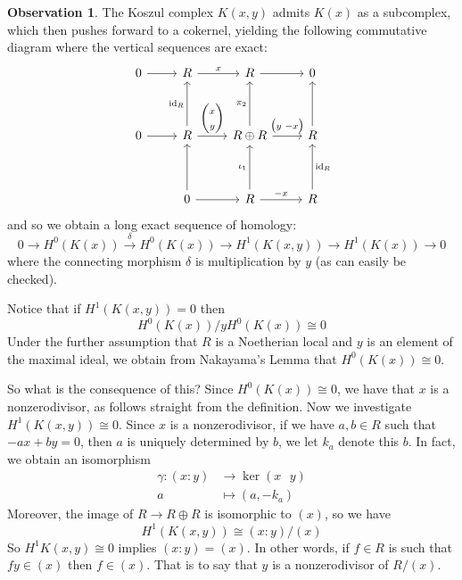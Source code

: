 \documentclass[12pt]{article}
\theoremstyle{plain}
\theoremstyle{definition}
\newtheorem{observation}[thm]{Observation}
\newcommand{\lto}{\longrightarrow}
\begin{document}
\begin{observation}\label{obs:koszul_reg}
	The Koszul complex $K(x,y)$ admits $K(x)$ as a subcomplex, which then pushes forward to a cokernel, yielding the following commutative diagram where the vertical sequences are exact:
	\begin{equation}\label{eq:sub_quotient}
		\begin{tikzcd}[row sep = huge]
			0\arrow[r] & R\arrow[r,"{x}"] & R\arrow[r] & 0\\
			0\arrow[r] & R\arrow[u,"{\operatorname{id}_R}"]\arrow[r,"{\begin{pmatrix}
					x\\
					y
				\end{pmatrix}
			}"] & R \oplus R\arrow[r,"{\begin{pmatrix}
					y \text{  } -x
				\end{pmatrix}
			}"]\arrow[u,"{\pi_2}"] & R\arrow[u]\\
			& 0\arrow[u]\arrow[r] & R\arrow[r,"{-x}"]\arrow[u,"{\iota_1}"] & R\arrow[u,swap,"{\operatorname{id}_R}"]
		\end{tikzcd}
	\end{equation}
	and so we obtain a long exact sequence of homology:
	\begin{equation}
		0\lto H^0(K(x)) \stackrel{\delta}{\lto} H^0(K(x)) \lto H^1(K(x,y)) \lto H^1(K(x))\lto 0
	\end{equation}
	where the connecting morphism $\delta$ is multiplication by $y$ (as can easily be checked).
	
	Notice that if $H^1(K(x,y))=0$ then
	\begin{equation}
		H^0(K(x))/yH^0(K(x)) \cong 0
	\end{equation}
	Under the further assumption that $R$ is a Noetherian local and $y$ is an element of the maximal ideal, we obtain from Nakayama's Lemma that $H^0(K(x)) \cong 0$.
	
	So what is the consequence of this? Since $H^0(K(x)) \cong 0$, we have that $x$ is a nonzerodivisor, as follows straight from the definition. Now we investigate $H^1(K(x,y)) \cong 0$. Since $x$ is a nonzerodivisor, if we have $a,b \in R$ such that $-ax + by = 0$, then $a$ is uniquely determined by $b$, we let $k_a$ denote this $b$. In fact, we obtain an isomorphism
	\begin{align*}
		\gamma: (x:y) &\lto \operatorname{ker}(x\text{ }y)\\
		a &\longmapsto (a,-k_a)
	\end{align*}
	Moreover, the image of $R \lto R \oplus R$ is isomorphic to $(x)$, so we have
	\begin{equation}
		H^1(K(x,y)) \cong (x:y)/(x)
	\end{equation}
	So $H^1K(x,y) \cong 0$ implies $(x:y) = (x)$. In other words, if $f \in R$ is such that $fy \in (x)$ then $f \in (x)$. That is to say that $y$ is a nonzerodivisor of $R/(x)$.
\end{observation}
\end{document}
